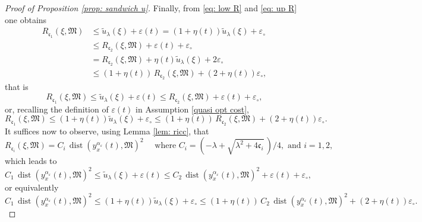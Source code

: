 \documentclass[10pt,a4paper]{amsart}
\begin{document}
\begin{proof}[Proof of Proposition \ref{prop: sandwich u}]
Finally, from \eqref{eq: low R} and \eqref{eq: up R} one obtains
\begin{equation*}
\begin{aligned}
    R_{\mathfrak{c}_{1}}(\xi, \mathfrak{M}) 
    & \leq \tilde{u}_{\lambda}(\xi) + \varepsilon(t) 
    = (1+\eta(t))\tilde{u}_{\lambda}(\xi) + \varepsilon_{\circ}\\
    & \leq R_{\mathfrak{c}_{2}}(\xi, \mathfrak{M}) + \varepsilon(t)+\varepsilon_{\circ} \\
    & = R_{\mathfrak{c}_{2}}(\xi, \mathfrak{M})+ \eta(t)\tilde{u}_{\lambda}(\xi) +2\varepsilon_{\circ} \\
    & \leq  (1+\eta(t))\,R_{\mathfrak{c}_{2}}(\xi, \mathfrak{M}) + (2+ \eta(t))\varepsilon_{\circ},
\end{aligned}
\end{equation*}
that is
\begin{equation*}
    R_{\mathfrak{c}_{1}}(\xi, \mathfrak{M}) 
    \leq \tilde{u}_{\lambda}(\xi) + \varepsilon(t) 
    \leq R_{\mathfrak{c}_{2}}(\xi, \mathfrak{M}) + \varepsilon(t)+\varepsilon_{\circ},
\end{equation*}
or, recalling the definition of $\varepsilon(t)$ in Assumption \ref{quasi opt cost}, 
\begin{equation*}
    R_{\mathfrak{c}_{1}}(\xi, \mathfrak{M}) 
    \leq (1+\eta(t))\tilde{u}_{\lambda}(\xi) + \varepsilon_{\circ} 
    \leq (1+\eta(t))\,R_{\mathfrak{c}_{2}}(\xi, \mathfrak{M}) + (2+ \eta(t))\varepsilon_{\circ}.
\end{equation*}
It suffices now to observe, using Lemma \ref{lem: ricc}, that
\begin{equation*}
    R_{\mathfrak{c}_{i}}(\xi,\mathfrak{M}) = C_{i}\,\operatorname{dist}(y_{x}^{\alpha_{\varepsilon}}(t),\mathfrak{M})^{2} \quad \text{ where }  C_{i} = (-\lambda + \sqrt{\lambda^{2} + 4\mathfrak{c}_{i}}\,)/4, \text{ and } i=1,2,
\end{equation*}
which leads to
\begin{equation*}
    C_{1}\,\operatorname{dist}(y_{x}^{\alpha_{\varepsilon}}(t),\mathfrak{M})^{2} 
    \leq \tilde{u}_{\lambda}(\xi) + \varepsilon(t) 
    \leq C_{2}\,\operatorname{dist}(y_{x}^{\alpha_{\varepsilon}}(t),\mathfrak{M})^{2} + \varepsilon(t)+\varepsilon_{\circ},
\end{equation*}
or equivalently
\begin{equation*}
    C_{1}\,\operatorname{dist}(y_{x}^{\alpha_{\varepsilon}}(t),\mathfrak{M})^{2}
    \leq (1+\eta(t))\tilde{u}_{\lambda}(\xi) + \varepsilon_{\circ} 
    \leq (1+\eta(t))\,C_{2}\,\operatorname{dist}(y_{x}^{\alpha_{\varepsilon}}(t),\mathfrak{M})^{2} + (2+ \eta(t))\varepsilon_{\circ}.
\end{equation*}
\end{proof}
\end{document}
